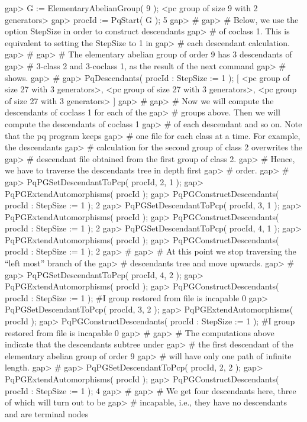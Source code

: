 \beginexample
gap> G := ElementaryAbelianGroup( 9 );
<pc group of size 9 with 2 generators>
gap> procId := PqStart( G );
5
gap> #
gap> #  Below, we use the option StepSize in order to construct descendants
gap> #  of coclass 1. This is equivalent to setting the StepSize to 1 in
gap> #  each descendant calculation.
gap> #
gap> #  The elementary abelian group of order 9 has 3 descendants of
gap> #  3-class 2 and 3-coclass 1, as the result of the next command
gap> #  shows. 
gap> #
gap> PqDescendants( procId : StepSize := 1 );
[ <pc group of size 27 with 3 generators>, 
  <pc group of size 27 with 3 generators>, 
  <pc group of size 27 with 3 generators> ]
gap> #
gap> #  Now we will compute the descendants of coclass 1 for each of the
gap> #  groups above. Then we will compute the descendants  of coclass 1
gap> #  of each descendant and so  on.  Note  that the  pq program keeps
gap> #  one file for each class at a time.  For example, the descendants
gap> #  calculation for  the  second  group  of class  2  overwrites the
gap> #  descendant file  obtained  from  the  first  group  of  class 2.
gap> #  Hence,  we have to traverse the descendants tree  in depth first
gap> #  order.
gap> #
gap> PqPGSetDescendantToPcp( procId, 2, 1 );
gap> PqPGExtendAutomorphisms( procId );
gap> PqPGConstructDescendants( procId : StepSize := 1 );
2
gap> PqPGSetDescendantToPcp( procId, 3, 1 );
gap> PqPGExtendAutomorphisms( procId );
gap> PqPGConstructDescendants( procId : StepSize := 1 );
2
gap> PqPGSetDescendantToPcp( procId, 4, 1 );
gap> PqPGExtendAutomorphisms( procId );
gap> PqPGConstructDescendants( procId : StepSize := 1 );
2
gap> #
gap> #  At this point we stop traversing the ``left most'' branch of the
gap> #  descendants tree and move upwards.
gap> #
gap> PqPGSetDescendantToPcp( procId, 4, 2 );
gap> PqPGExtendAutomorphisms( procId );
gap> PqPGConstructDescendants( procId : StepSize := 1 );
#I  group restored from file is incapable
0
gap> PqPGSetDescendantToPcp( procId, 3, 2 );
gap> PqPGExtendAutomorphisms( procId );
gap> PqPGConstructDescendants( procId : StepSize := 1 );
#I  group restored from file is incapable
0
gap> #  
gap> #  The computations above indicate that the descendants subtree under
gap> #  the first descendant of the elementary abelian group of order 9
gap> #  will have only one path of infinite length.
gap> #
gap> PqPGSetDescendantToPcp( procId, 2, 2 );
gap> PqPGExtendAutomorphisms( procId );
gap> PqPGConstructDescendants( procId : StepSize := 1 );
4
gap> #
gap> #  We get four descendants here, three of which will turn out to be
gap> #  incapable, i.e., they have no descendants and are terminal nodes
